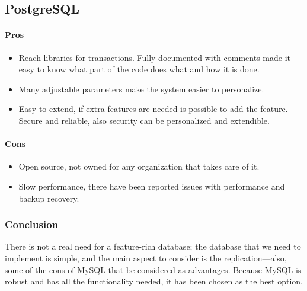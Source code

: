 \subsection{ PostgreSQL \cite{sdpost}} 

\paragraph{Pros}

\begin{itemize}
\item Reach libraries for transactions. Fully documented with comments made it easy to know what part of the code does what and how it is done.
\item  Many adjustable parameters make the system easier to personalize. 
\item Easy to extend, if extra features are needed is possible to add the feature. Secure and reliable, also security can be personalized and extendible.
\end{itemize}
\paragraph{Cons}

\begin{itemize}
\item Open source, not owned for any organization that takes care of it. 
\item Slow performance, there have been reported issues with performance and backup recovery.
\end{itemize}


\subsubsection{Conclusion}

\indent
\indent
There is not a real need for a feature-rich database; the database that we need to implement is simple, and the main aspect to consider is the replication—also, some of the cons of MySQL that be considered as advantages. Because MySQL is robust and has all the functionality needed, it has been chosen as the best option.
